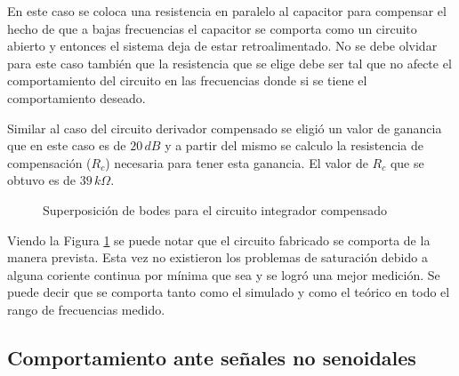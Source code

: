 En este caso se coloca una resistencia en paralelo al capacitor para compensar el hecho de que a bajas frecuencias el capacitor se comporta como un circuito abierto y entonces el sistema deja de estar retroalimentado. No se debe olvidar para este caso también que la resistencia que se elige debe ser tal que no afecte el comportamiento del circuito en las frecuencias donde si se tiene el comportamiento deseado.

Similar al caso del circuito derivador compensado se eligió un valor de ganancia que en este caso es de $20 \, dB$ y a partir del mismo se calculo la resistencia de compensación ($R_c$) necesaria para tener esta ganancia. El valor de $R_c$ que se obtuvo es de $39 \,k \Omega$.

\begin{figure}[H]
	\begin{center}
		\caption{Superposición de bodes para el circuito integrador compensado}
		\label{fig:superposicion3casosintegradorCOMPENSADO}
	\end{center}
\end{figure}

Viendo la Figura \ref{fig:superposicion3casosintegradorCOMPENSADO} se puede notar que el circuito fabricado se comporta de la manera prevista. Esta vez no existieron los problemas de saturación debido a alguna coriente continua por mínima que sea y se logró una mejor medición. Se puede decir que se comporta tanto como el simulado y como el teórico en todo el rango de frecuencias medido.

\subsection{Comportamiento ante señales no senoidales}


